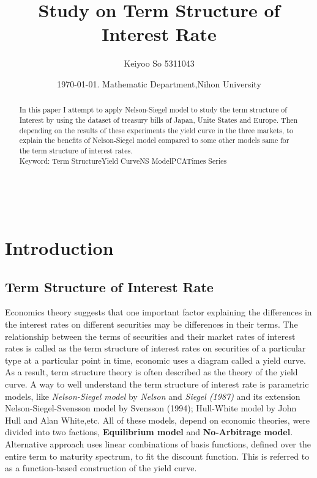 \documentclass{article}
\title{Study on Term Structure of Interest Rate}
\author{Keiyoo So 5311043}
\date{\today. Mathematic Department,Nihon University}
\begin{document}
\fontsize{10pt}{9pt}

\maketitle
\begin{spacing}{1.5}
\begin{abstract}
In this paper I attempt to apply Nelson-Siegel model to study the term structure of Interest by using the dataset of treasury bills of Japan, Unite States and Europe. Then depending on the results of these experiments the yield curve in the three markets, to explain the benefits of Nelson-Siegel model compared to some other models same for the term structure of interest rates.
\\

Keyword: Term Structure\qquad Yield Curve\qquad NS Model\qquad PCA\qquad Times Series  
\end{abstract}
\\
\section{Introduction}
\subsection{Term Structure of Interest Rate}
   Economics theory suggests that one important factor explaining the differences in the interest rates on different securities may be differences in their terms. The relationship between the terms of securities and their market rates of interest rates is called as the term structure of interest rates on securities of a particular type at a particular point in time, economic uses a diagram called a yield curve. As a result, term structure theory is often described as the theory of the yield curve. A way to well understand the term structure of interest rate is parametric models, like \textit{Nelson-Siegel model} by \textit{Nelson} and \textit{Siegel (1987)} and its extension Nelson-Siegel-Svensson model by Svensson (1994); Hull-White model by John Hull and Alan White,etc. All of these models, depend on economic theories, were divided into two factions, \textbf{Equilibrium model} and \textbf{No-Arbitrage model}. Alternative approach uses linear combinations of basis functions, defined over the entire term to maturity spectrum, to fit the discount function. This is referred to as a function-based construction of the yield curve.\\  
  

\end{spacing}
\end{document}
